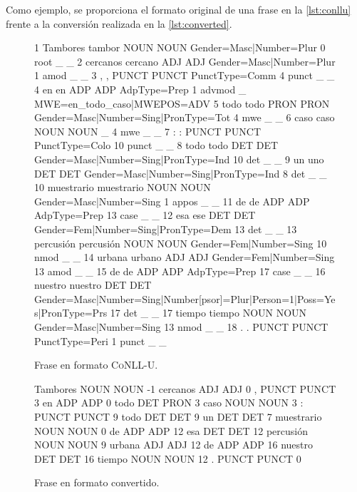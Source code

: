 Como ejemplo, se proporciona el formato original de una frase en la
\autoref{lst:conllu} frente a la conversión realizada en la
\autoref{lst:converted}.
\begin{figure}[ht]
  \begin{bashcode}
1       Tambores        tambor  NOUN    NOUN    Gender=Masc|Number=Plur 0       root    _       _
2       cercanos        cercano ADJ     ADJ     Gender=Masc|Number=Plur 1       amod    _       _
3       ,       ,       PUNCT   PUNCT   PunctType=Comm  4       punct   _       _
4       en      en      ADP     ADP     AdpType=Prep    1       advmod  _       MWE=en_todo_caso|MWEPOS=ADV
5       todo    todo    PRON    PRON    Gender=Masc|Number=Sing|PronType=Tot    4       mwe     _       _
6       caso    caso    NOUN    NOUN    _       4       mwe     _       _
7       :       :       PUNCT   PUNCT   PunctType=Colo  10      punct   _       _
8       todo    todo    DET     DET     Gender=Masc|Number=Sing|PronType=Ind    10      det     _       _
9       un      uno     DET     DET     Gender=Masc|Number=Sing|PronType=Ind    8       det     _       _
10      muestrario      muestrario      NOUN    NOUN    Gender=Masc|Number=Sing 1       appos   _       _
11      de      de      ADP     ADP     AdpType=Prep    13      case    _       _
12      esa     ese     DET     DET     Gender=Fem|Number=Sing|PronType=Dem     13      det     _       _
13      percusión       percusión       NOUN    NOUN    Gender=Fem|Number=Sing  10      nmod    _       _
14      urbana  urbano  ADJ     ADJ     Gender=Fem|Number=Sing  13      amod    _       _
15      de      de      ADP     ADP     AdpType=Prep    17      case    _       _
16      nuestro nuestro DET     DET     Gender=Masc|Number=Sing|Number[psor]=Plur|Person=1|Poss=Yes|PronType=Prs        17      det     _       _
17      tiempo  tiempo  NOUN    NOUN    Gender=Masc|Number=Sing 13      nmod    _       _
18      .       .       PUNCT   PUNCT   PunctType=Peri  1       punct   _       _
  \end{bashcode}
  \caption{Frase en formato \textsc{CoNLL-U}.}
  \label{lst:conllu}
\end{figure}
\begin{figure}[hb]
  \begin{bashcode}
Tambores        NOUN    NOUN    -1
cercanos        ADJ     ADJ     0
,       PUNCT   PUNCT   3
en      ADP     ADP     0
todo    DET     PRON    3
caso    NOUN    NOUN    3
:       PUNCT   PUNCT   9
todo    DET     DET     9
un      DET     DET     7
muestrario      NOUN    NOUN    0
de      ADP     ADP     12
esa     DET     DET     12
percusión       NOUN    NOUN    9
urbana  ADJ     ADJ     12
de      ADP     ADP     16
nuestro DET     DET     16
tiempo  NOUN    NOUN    12
.       PUNCT   PUNCT   0
  \end{bashcode}
  \caption{Frase en formato convertido.}
  \label{lst:converted}
\end{figure}


